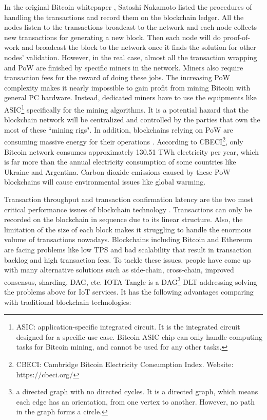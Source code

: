 In the original Bitcoin whitepaper \cite{nakamoto2008peer}, Satoshi Nakamoto listed the procedures of handling the transactions and record them on the blockchain ledger.
All the nodes listen to the transactions broadcast to the network and each node collects new transactions for generating a new block.
Then each node will do proof-of-work and broadcast the block to the network once it finds the solution for other nodes' validation.
However, in the real case, almost all the transaction wrapping and PoW are finished by specific miners in the network. Miners also require transaction fees for the reward of doing these jobs.
The increasing PoW complexity makes it nearly impossible to gain profit from mining Bitcoin with general PC hardware. Instead, dedicated miners have to use the equipments like ASIC\footnote{ASIC: application-specific integrated circuit. It is the integrated circuit designed for a specific use case. Bitcoin ASIC chip can only handle computing tasks for Bitcoin mining, and cannot be used for any other tasks.} specifically for the mining algorithms.
It is a potential hazard that the blockchain network will be centralized and controlled by the parties that own the most of these ``mining rigs". In addition, blockchains relying on PoW are consuming massive energy for their operations \cite{sedlmeir2020energy}. According to CBECI\footnote{CBECI: Cambridge Bitcoin Electricity Consumption Index. Website: https://cbeci.org/}, only Bitcoin network consumes approximately 130.51 TWh electricity per year, which is far more than the annual electricity consumption of some countries like Ukraine and Argentina. Carbon dioxide emissions caused by these PoW blockchains will cause environmental issues like global warming.


Transaction throughput and transaction confirmation latency are the two most critical performance issues of blockchain technology \cite{zhou2020solutions}.
Transactions can only be recorded on the blockchain in sequence due to its linear structure. Also, the limitation of the size of each block makes it struggling to handle the enormous volume of transactions nowadays.
Blockchains including Bitcoin and Ethereum are facing problems like low TPS and bad scalability that result in transaction backlog and high transaction fees.
To tackle these issues, people have come up with many alternative solutions such as side-chain, cross-chain, improved consensus, sharding, DAG, etc.
IOTA Tangle is a DAG\footnote{a directed graph with no directed cycles. It is a directed graph, which means each edge has an orientation, from one vertex to another. However, no path in the graph forms a circle.} DLT addressing solving the problems above for IoT services. It has the following advantages comparing with traditional blockchain technologies:

